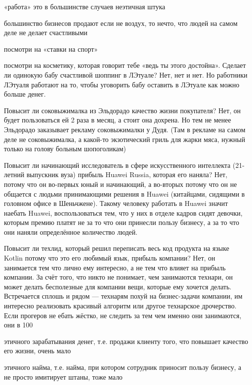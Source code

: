 \documentclass[11pt]{article}
\theoremstyle{remark}
\theoremstyle{definition}
\begin{document}
\begin{enumerate}
«работа» это в большинстве случаев неэтичная штука 

большинство бизнесов продают если не воздух, то нечто, что людей на самом деле не делает счастливыми

посмотри на «ставки на спорт»

посмотри на косметику, которая говорит тебе «ведь ты этого достойна». Сделает ли одинокую бабу счастливой шоппинг в ЛЭтуале? Нет, нет и нет. Но работники ЛЭтуаля работают на то, чтобы уговорить бабу оставить в ЛЭтуале как можно больше денег.

Повысит ли соковыжималка из Эльдорадо качество жизни покупателя? Нет, он будет пользоваться ей 2 раза в месяц, а стоит она дохрена. Но тем не менее Эльдорадо заказывает рекламу соковыжималки у Дудя. (Там в рекламе на самом деле не соковыжималка, а какой-то экзотический гриль для жарки мяса, нужный только на голову больным шопоголикам)

Повысит ли начинающий исследователь в сфере искусственного интеллекта (21-летний выпускник вуза) прибыль Huawei Russia, которая его наняла? Нет, потому что он во-первых юный и начинающий, а во-вторых потому что он не общается с людьми принимающими решения в Huawei (китайцами, сидящими в головном офисе в Шеньчжене). Такому человеку работать в Huawei значит наебать Huawei, воспользоваться тем, что у них в отделе кадров сидят девочки, которым премию платят не за то что они принесли пользу бизнесу, а за то что они наняли определённое количество людей.

Повысит ли техлид, который решил переписать весь код продукта на языке Kotlin потому что это его любимый язык, прибыль компании? Нет, он занимается тем что лично ему интересно, а не тем что влияет на прибыль компании. За счёт того, что никто не понимает, чем занимаются технари, он может делать бесполезные для компании вещи, которые ему хочется делать. Встречается сплошь и рядом — технарям похуй на бизнес-задачи компании, им интересно реализовать красивый алгоритм или другое технарское дрочерство. Если прогеров не ебать жёстко, не следить за тем чем именно они занимаются, они в 100%


этичного зарабатывания денег, т.е. продажи клиенту того, что повышает качество его жизни, очень мало

этичного найма, т.е. найма, при котором сотрудник приносит пользу бизнесу, а не просто имитирует штаны, тоже мало


\end{enumerate}
\end{document}
